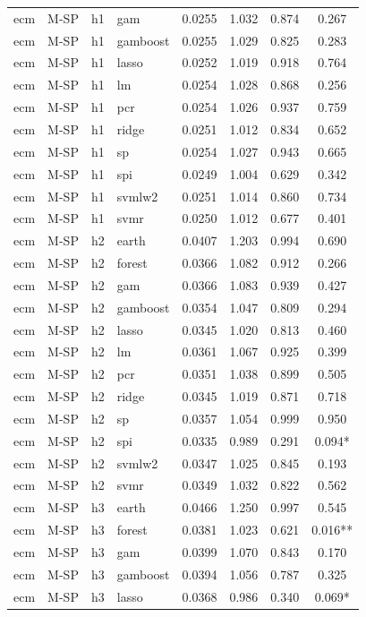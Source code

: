 \begin{ThreePartTable}
\begin{longtable}[t]{llclcccc}
ecm & M-SP & h1 & gam & 0.0255 & 1.032 & 0.874 & 0.267\\
ecm & M-SP & h1 & gamboost & 0.0255 & 1.029 & 0.825 & 0.283\\
ecm & M-SP & h1 & lasso & 0.0252 & 1.019 & 0.918 & 0.764\\
ecm & M-SP & h1 & lm & 0.0254 & 1.028 & 0.868 & 0.256\\
ecm & M-SP & h1 & pcr & 0.0254 & 1.026 & 0.937 & 0.759\\
ecm & M-SP & h1 & ridge & 0.0251 & 1.012 & 0.834 & 0.652\\
ecm & M-SP & h1 & sp & 0.0254 & 1.027 & 0.943 & 0.665\\
ecm & M-SP & h1 & spi & 0.0249 & 1.004 & 0.629 & 0.342\\
ecm & M-SP & h1 & svmlw2 & 0.0251 & 1.014 & 0.860 & 0.734\\
ecm & M-SP & h1 & svmr & 0.0250 & 1.012 & 0.677 & 0.401\\
\addlinespace
ecm & M-SP & h2 & earth & 0.0407 & 1.203 & 0.994 & 0.690\\
ecm & M-SP & h2 & forest & 0.0366 & 1.082 & 0.912 & 0.266\\
ecm & M-SP & h2 & gam & 0.0366 & 1.083 & 0.939 & 0.427\\
ecm & M-SP & h2 & gamboost & 0.0354 & 1.047 & 0.809 & 0.294\\
ecm & M-SP & h2 & lasso & 0.0345 & 1.020 & 0.813 & 0.460\\
ecm & M-SP & h2 & lm & 0.0361 & 1.067 & 0.925 & 0.399\\
ecm & M-SP & h2 & pcr & 0.0351 & 1.038 & 0.899 & 0.505\\
ecm & M-SP & h2 & ridge & 0.0345 & 1.019 & 0.871 & 0.718\\
ecm & M-SP & h2 & sp & 0.0357 & 1.054 & 0.999 & 0.950\\
ecm & M-SP & h2 & spi & 0.0335 & 0.989 & 0.291 & 0.094*\\
ecm & M-SP & h2 & svmlw2 & 0.0347 & 1.025 & 0.845 & 0.193\\
ecm & M-SP & h2 & svmr & 0.0349 & 1.032 & 0.822 & 0.562\\
\addlinespace
ecm & M-SP & h3 & earth & 0.0466 & 1.250 & 0.997 & 0.545\\
ecm & M-SP & h3 & forest & 0.0381 & 1.023 & 0.621 & 0.016**\\
ecm & M-SP & h3 & gam & 0.0399 & 1.070 & 0.843 & 0.170\\
ecm & M-SP & h3 & gamboost & 0.0394 & 1.056 & 0.787 & 0.325\\
ecm & M-SP & h3 & lasso & 0.0368 & 0.986 & 0.340 & 0.069*\\

\end{longtable}
\end{ThreePartTable}
